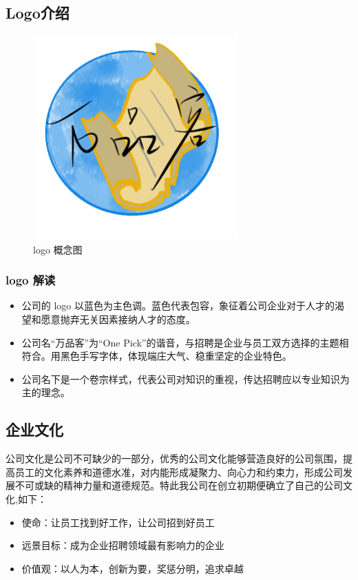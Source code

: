 \documentclass[UTF8]{ctexart}
\begin{document}
\subsection{Logo介绍}
\begin{figure}[H] %
	\centering %
	\includegraphics[width=0.7\textwidth]{pics/logo.png} %
	\caption{logo 概念图} %
	\label{Fig.main2} %
\end{figure}
\subsubsection{logo 解读}
\begin{itemize}
	\item{公司的 logo 以蓝色为主色调。蓝色代表包容，象征着公司企业对于人才的渴望和愿意抛弃无关因素接纳人才的态度。}
	\item{公司名“万品客”为“One Pick”的谐音，与招聘是企业与员工双方选择的主题相符合。用黑色手写字体，体现端庄大气、稳重坚定的企业特色。}
	\item{公司名下是一个卷宗样式，代表公司对知识的重视，传达招聘应以专业知识为主的理念。}
\end{itemize}
\subsection{企业文化}

公司文化是公司不可缺少的一部分，优秀的公司文化能够营造良好的公司氛围，提高员工的文化素养和道德水准，对内能形成凝聚力、向心力和约束力，形成公司发展不可或缺的精神力量和道德规范。特此我公司在创立初期便确立了自己的公司文化,如下：
\begin{itemize}
	\item 使命：让员工找到好工作，让公司招到好员工
	\item 远景目标：成为企业招聘领域最有影响力的企业
	\item 价值观：以人为本，创新为要，奖惩分明，追求卓越
\end{itemize}
\end{document}
